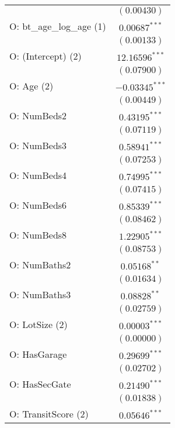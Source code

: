 \begin{table}
\begin{center}
\begin{tiny}
\begin{tabular}{l c}
                                  & $(0.00430)$      \\
O: bt\_age\_log\_age (1)          & $0.00687^{***}$  \\
                                  & $(0.00133)$      \\
O: (Intercept) (2)                & $12.16596^{***}$ \\
                                  & $(0.07900)$      \\
O: Age (2)                        & $-0.03345^{***}$ \\
                                  & $(0.00449)$      \\
O: NumBeds2                       & $0.43195^{***}$  \\
                                  & $(0.07119)$      \\
O: NumBeds3                       & $0.58941^{***}$  \\
                                  & $(0.07253)$      \\
O: NumBeds4                       & $0.74995^{***}$  \\
                                  & $(0.07415)$      \\
O: NumBeds6                       & $0.85339^{***}$  \\
                                  & $(0.08462)$      \\
O: NumBeds8                       & $1.22905^{***}$  \\
                                  & $(0.08753)$      \\
O: NumBaths2                      & $0.05168^{**}$   \\
                                  & $(0.01634)$      \\
O: NumBaths3                      & $0.08828^{**}$   \\
                                  & $(0.02759)$      \\
O: LotSize (2)                    & $0.00003^{***}$  \\
                                  & $(0.00000)$      \\
O: HasGarage                      & $0.29699^{***}$  \\
                                  & $(0.02702)$      \\
O: HasSecGate                     & $0.21490^{***}$  \\
                                  & $(0.01838)$      \\
O: TransitScore (2)               & $0.05646^{***}$  \\

\end{tabular}
\end{tiny}
\end{center}
\end{table}
